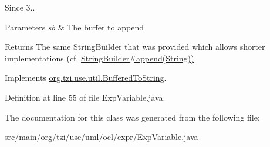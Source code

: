 \begin{DoxySince}{Since}
3.. 
\end{DoxySince}

\begin{DoxyParams}{Parameters}
{\em sb} & The buffer to append \\
\hline
\end{DoxyParams}
\begin{DoxyReturn}{Returns}
The same String\-Builder that was provided which allows shorter implementations (cf. \hyperlink{}{String\-Builder\#append(\-String))} 
\end{DoxyReturn}


Implements \hyperlink{interfaceorg_1_1tzi_1_1use_1_1util_1_1_buffered_to_string_aea95e4e53b18818d50ee253700e6e2d5}{org.\-tzi.\-use.\-util.\-Buffered\-To\-String}.



Definition at line 55 of file Exp\-Variable.\-java.



The documentation for this class was generated from the following file\-:\begin{DoxyCompactItemize}
\item 
src/main/org/tzi/use/uml/ocl/expr/\hyperlink{_exp_variable_8java}{Exp\-Variable.\-java}\end{DoxyCompactItemize}
